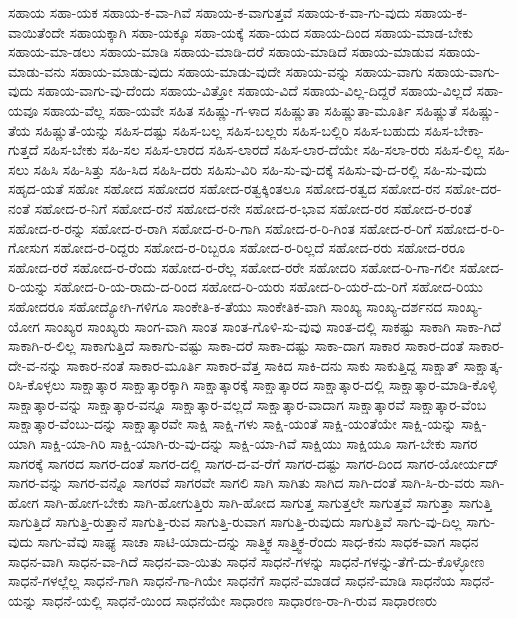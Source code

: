 {ಸಹಾಯ
ಸಹಾ-ಯಕ
ಸಹಾಯ-ಕ-ವಾ-ಗಿವೆ
ಸಹಾಯ-ಕ-ವಾಗುತ್ತವೆ
ಸಹಾಯ-ಕ-ವಾ-ಗು-ವುದು
ಸಹಾಯ-ಕ-ವಾಯಿತೆಂದೇ
ಸಹಾಯಕ್ಕಾಗಿ
ಸಹಾ-ಯಕ್ಕೂ
ಸಹಾ-ಯಕ್ಕೆ
ಸಹಾ-ಯದ
ಸಹಾಯ-ದಿಂದ
ಸಹಾಯ-ಮಾಡ-ಬೇಕು
ಸಹಾಯ-ಮಾ-ಡಲು
ಸಹಾಯ-ಮಾಡಿ
ಸಹಾಯ-ಮಾಡಿ-ದರೆ
ಸಹಾಯ-ಮಾಡಿದೆ
ಸಹಾಯ-ಮಾಡುವ
ಸಹಾಯ-ಮಾಡು-ವನು
ಸಹಾಯ-ಮಾಡು-ವುದು
ಸಹಾಯ-ಮಾಡು-ವುದೇ
ಸಹಾಯ-ವನ್ನು
ಸಹಾಯ-ವಾಗು
ಸಹಾಯ-ವಾಗು-ವುದು
ಸಹಾಯ-ವಾಗು-ವು-ದೆಂದು
ಸಹಾಯ-ವಿತ್ತೋ
ಸಹಾಯ-ವಿದೆ
ಸಹಾಯ-ವಿಲ್ಲ-ದಿದ್ದರೆ
ಸಹಾಯ-ವಿಲ್ಲದೆ
ಸಹಾ-ಯವೂ
ಸಹಾಯ-ವೆಲ್ಲ
ಸಹಾ-ಯವೇ
ಸಹಿತ
ಸಹಿಷ್ಣು-ಗ-ಳಾದ
ಸಹಿಷ್ಣುತಾ
ಸಹಿಷ್ಣುತಾ-ಮೂರ್ತಿ
ಸಹಿಷ್ಣುತೆ
ಸಹಿಷ್ಣು-ತೆಯ
ಸಹಿಷ್ಣುತೆ-ಯನ್ನು
ಸಹಿಸ-ದಷ್ಟು
ಸಹಿಸ-ಬಲ್ಲ
ಸಹಿಸ-ಬಲ್ಲರು
ಸಹಿಸ-ಬಲ್ಲಿರಿ
ಸಹಿಸ-ಬಹುದು
ಸಹಿಸ-ಬೇಕಾ-ಗುತ್ತದೆ
ಸಹಿಸ-ಬೇಕು
ಸಹಿ-ಸಲ
ಸಹಿಸ-ಲಾರದ
ಸಹಿಸ-ಲಾರದೆ
ಸಹಿಸ-ಲಾರ-ದೆಯೇ
ಸಹಿ-ಸಲಾ-ರರು
ಸಹಿಸ-ಲಿಲ್ಲ
ಸಹಿ-ಸಲು
ಸಹಿಸಿ
ಸಹಿ-ಸಿತ್ತು
ಸಹಿ-ಸಿದ
ಸಹಿಸಿ-ದರು
ಸಹಿಸು-ವಿರಿ
ಸಹಿ-ಸು-ವು-ದಕ್ಕೆ
ಸಹಿಸು-ವು-ದ-ರಲ್ಲಿ
ಸಹಿ-ಸು-ವುದು
ಸಹೃದ-ಯತೆ
ಸಹೋ
ಸಹೋದ
ಸಹೋದರ
ಸಹೋದ-ರತ್ವಕ್ಕಿಂತಲೂ
ಸಹೋದ-ರತ್ವದ
ಸಹೋದ-ರನ
ಸಹೋ-ದರ-ನಂತೆ
ಸಹೋದ-ರ-ನಿಗೆ
ಸಹೋದ-ರನೆ
ಸಹೋದ-ರನೇ
ಸಹೋದ-ರ-ಭಾವ
ಸಹೋದ-ರರ
ಸಹೋದ-ರ-ರಂತೆ
ಸಹೋದ-ರ-ರನ್ನು
ಸಹೋದ-ರ-ರಾಗಿ
ಸಹೋದ-ರ-ರಿ-ಗಾಗಿ
ಸಹೋದ-ರ-ರಿ-ಗಿಂತ
ಸಹೋದ-ರ-ರಿಗೆ
ಸಹೋದ-ರ-ರಿ-ಗೋಸುಗ
ಸಹೋದ-ರ-ರಿದ್ದರು
ಸಹೋದ-ರ-ರಿಬ್ಬರೂ
ಸಹೋದ-ರ-ರಿಲ್ಲದೆ
ಸಹೋದ-ರರು
ಸಹೋದ-ರರೂ
ಸಹೋದ-ರರೆ
ಸಹೋದ-ರ-ರೆಂದು
ಸಹೋದ-ರ-ರೆಲ್ಲ
ಸಹೋದ-ರರೇ
ಸಹೋದರಿ
ಸಹೋದ-ರಿ-ಗಾ-ಗಲೀ
ಸಹೋದ-ರಿ-ಯನ್ನು
ಸಹೋದ-ರಿ-ಯ-ರಾದು-ದ-ರಿಂದ
ಸಹೋದ-ರಿ-ಯರು
ಸಹೋದ-ರಿ-ಯರೆ-ದು-ರಿಗೆ
ಸಹೋದ-ರಿಯು
ಸಹೋದರೂ
ಸಹೋದ್ಯೋಗಿ-ಗಳಿಗೂ
ಸಾಂಕೇತಿ-ಕ-ತೆಯು
ಸಾಂಕೇತಿಕ-ವಾಗಿ
ಸಾಂಖ್ಯ
ಸಾಂಖ್ಯ-ದರ್ಶನದ
ಸಾಂಖ್ಯ-ಯೋಗ
ಸಾಂಖ್ಯರ
ಸಾಂಖ್ಯರು
ಸಾಂಗ-ವಾಗಿ
ಸಾಂತ
ಸಾಂತ-ಗೊಳಿ-ಸು-ವುವು
ಸಾಂತ-ದಲ್ಲಿ
ಸಾಕಷ್ಟು
ಸಾಕಾಗಿ
ಸಾಕಾ-ಗಿದೆ
ಸಾಕಾಗಿ-ರ-ಲಿಲ್ಲ
ಸಾಕಾಗುತ್ತಿದೆ
ಸಾಕಾಗು-ವಷ್ಟು
ಸಾಕಾ-ದರೆ
ಸಾಕಾ-ದಷ್ಟು
ಸಾಕಾ-ದಾಗ
ಸಾಕಾರ
ಸಾಕಾರ-ದಂತೆ
ಸಾಕಾರ-ದೇ-ವ-ನನ್ನು
ಸಾಕಾರ-ನಂತೆ
ಸಾಕಾರ-ಮೂರ್ತಿ
ಸಾಕಾರ-ವೆತ್ತ
ಸಾಕಿದ
ಸಾಕಿ-ದನು
ಸಾಕು
ಸಾಕುತ್ತಿದ್ದ
ಸಾಕ್ಷಾತ್
ಸಾಕ್ಷಾತ್ಕ-ರಿಸಿ-ಕೊಳ್ಳಲು
ಸಾಕ್ಷಾತ್ಕಾರ
ಸಾಕ್ಷಾತ್ಕಾರಕ್ಕಾಗಿ
ಸಾಕ್ಷಾತ್ಕಾರಕ್ಕೆ
ಸಾಕ್ಷಾತ್ಕಾರದ
ಸಾಕ್ಷಾತ್ಕಾರ-ದಲ್ಲಿ
ಸಾಕ್ಷಾತ್ಕಾರ-ಮಾಡಿ-ಕೊಳ್ಳಿ
ಸಾಕ್ಷಾತ್ಕಾರ-ವನ್ನು
ಸಾಕ್ಷಾತ್ಕಾರ-ವನ್ನೂ
ಸಾಕ್ಷಾತ್ಕಾರ-ವಲ್ಲದೆ
ಸಾಕ್ಷಾತ್ಕಾರ-ವಾದಾಗ
ಸಾಕ್ಷಾತ್ಕಾರವೆ
ಸಾಕ್ಷಾತ್ಕಾರ-ವೆಂಬ
ಸಾಕ್ಷಾತ್ಕಾರ-ವೆಂಬು-ದನ್ನು
ಸಾಕ್ಷಾತ್ಕಾರವೇ
ಸಾಕ್ಷಿ
ಸಾಕ್ಷಿ-ಗಳು
ಸಾಕ್ಷಿ-ಯಂತೆ
ಸಾಕ್ಷಿ-ಯಂತೆಯೇ
ಸಾಕ್ಷಿ-ಯನ್ನು
ಸಾಕ್ಷಿ-ಯಾಗಿ
ಸಾಕ್ಷಿ-ಯಾ-ಗಿರಿ
ಸಾಕ್ಷಿ-ಯಾಗಿ-ರು-ವು-ದನ್ನು
ಸಾಕ್ಷಿ-ಯಾ-ಗಿವೆ
ಸಾಕ್ಷಿಯು
ಸಾಕ್ಷಿಯೂ
ಸಾಗ-ಬೇಕು
ಸಾಗರ
ಸಾಗರಕ್ಕೆ
ಸಾಗರದ
ಸಾಗರ-ದಂತೆ
ಸಾಗರ-ದಲ್ಲಿ
ಸಾಗರ-ದ-ವ-ರೆಗೆ
ಸಾಗರ-ದಷ್ಟು
ಸಾಗರ-ದಿಂದ
ಸಾಗರ-ಯೋರ್ಯದ್
ಸಾಗರ-ವನ್ನು
ಸಾಗರ-ವನ್ನೊ
ಸಾಗರವೆ
ಸಾಗರವೇ
ಸಾಗಲಿ
ಸಾಗಿ
ಸಾಗಿತು
ಸಾಗಿದ
ಸಾಗಿ-ದಂತೆ
ಸಾಗಿ-ಸಿ-ರು-ವರು
ಸಾಗಿ-ಹೋಗ
ಸಾಗಿ-ಹೋಗ-ಬೇಕು
ಸಾಗಿ-ಹೋಗುತ್ತಿರು
ಸಾಗಿ-ಹೋದ
ಸಾಗುತ್ತ
ಸಾಗುತ್ತಲೇ
ಸಾಗುತ್ತವೆ
ಸಾಗುತ್ತಾ
ಸಾಗುತ್ತಿ
ಸಾಗುತ್ತಿದೆ
ಸಾಗುತ್ತಿ-ರುತ್ತಾನೆ
ಸಾಗುತ್ತಿ-ರುವ
ಸಾಗುತ್ತಿ-ರುವಾಗ
ಸಾಗುತ್ತಿ-ರುವುದು
ಸಾಗುತ್ತಿವೆ
ಸಾಗು-ವು-ದಿಲ್ಲ
ಸಾಗು-ವುದು
ಸಾಗು-ವೆವು
ಸಾಘ್ಯ
ಸಾಚಾ
ಸಾಟಿ-ಯಾದು-ದನ್ನು
ಸಾತ್ತ್ವಿಕ
ಸಾತ್ತ್ವಿಕ-ರೆಂದು
ಸಾಧ-ಕನು
ಸಾಧಕ-ವಾಗ
ಸಾಧನ
ಸಾಧನ-ವಾಗಿ
ಸಾಧನ-ವಾ-ಗಿದೆ
ಸಾಧನ-ವಾ-ಯಿತು
ಸಾಧನೆ
ಸಾಧನೆ-ಗಳನ್ನು
ಸಾಧನೆ-ಗಳನ್ನು-ತೆಗೆ-ದು-ಕೊಳ್ಳೋಣ
ಸಾಧನೆ-ಗಳಲ್ಲೆಲ್ಲ
ಸಾಧನೆ-ಗಾಗಿ
ಸಾಧನೆ-ಗಾ-ಗಿಯೇ
ಸಾಧನೆಗೆ
ಸಾಧನೆ-ಮಾಡದೆ
ಸಾಧನೆ-ಮಾಡಿ
ಸಾಧನೆಯ
ಸಾಧನೆ-ಯನ್ನು
ಸಾಧನೆ-ಯಲ್ಲಿ
ಸಾಧನೆ-ಯಿಂದ
ಸಾಧನೆಯೇ
ಸಾಧಾರಣ
ಸಾಧಾರಣ-ರಾ-ಗಿ-ರುವ
ಸಾಧಾರಣರು
}
